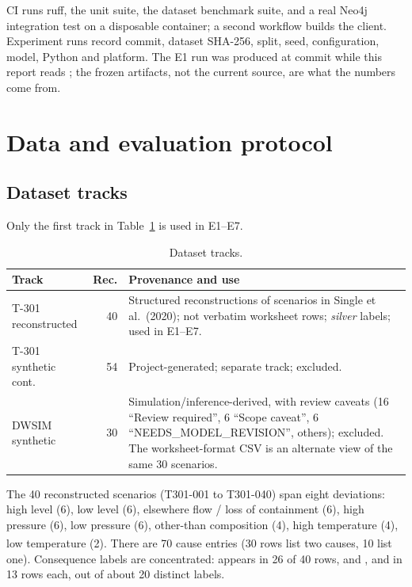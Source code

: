 \documentclass[10pt,twocolumn,a4paper]{extarticle}
\newcommand{\silver}{\emph{silver}}
\newcommand{\derived}{\textsuperscript{\textdagger}}
\begin{document}
CI runs ruff, the unit suite, the dataset benchmark suite, and a real Neo4j integration test on a disposable container; a second workflow builds the client. Experiment runs record commit, dataset SHA-256, split, seed, configuration, model, Python and platform. The E1 run was produced at commit  while this report reads ; the frozen artifacts, not the current source, are what the numbers come from.

\section{Data and evaluation protocol}\label{ch:data}

\subsection{Dataset tracks}
Only the first track in Table~\ref{tab:tracks} is used in E1--E7.

\begin{table}[t]
\centering
\caption{Dataset tracks.}
\label{tab:tracks}
\begin{tabularx}{\columnwidth}{@{}>{\raggedright\arraybackslash}p{1.9cm} r >{\raggedright\arraybackslash}X@{}}
\toprule
\textbf{Track} & \textbf{Rec.} & \textbf{Provenance and use}\\
\midrule
T-301 reconstructed & 40 & Structured reconstructions of scenarios in Single et al.\ (2020); not verbatim worksheet rows; \silver{} labels; used in E1--E7.\\
T-301 synthetic cont. & 54 & Project-generated; separate track; excluded.\\
DWSIM synthetic & 30 & Simulation/inference-derived, with review caveats (16 ``Review required'', 6 ``Scope caveat'', 6 ``NEEDS\_MODEL\_REVISION'', others); excluded. The worksheet-format CSV is an alternate view of the same 30 scenarios.\\
\bottomrule
\end{tabularx}
\end{table}

The 40 reconstructed scenarios (T301-001 to T301-040) span eight deviations: high level (6), low level (6), elsewhere flow / loss of containment (6), high pressure (6), low pressure (6), other-than composition (4), high temperature (4), low temperature (2).\derived{} There are 70 cause entries (30 rows list two causes, 10 list one). Consequence labels are concentrated:  appears in 26 of 40 rows, and ,  and  in 13 rows each, out of about 20 distinct labels.
\end{document}
